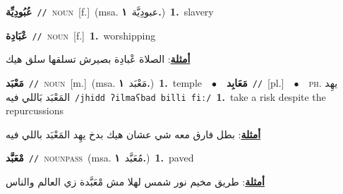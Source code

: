 \documentclass[10pt,a4paper,twoside]{article} %
\begin{document}
\begin{multicols}{2}
{{\setlength\topsep{0pt}\textbf{\foreignlanguage{arabic}{عُبُودِيِّة}}\ {\color{gray}\texttt{//}\color{black}}\ \textsc{noun}\ [f.]\ \color{gray}(msa. \foreignlanguage{arabic}{عبودِيَّة}~\foreignlanguage{arabic}{\textbf{١.}})\color{black}\ \textbf{1.}~slavery\ 

{\setlength\topsep{0pt}\textbf{\foreignlanguage{arabic}{عْبَادِة}}\ {\color{gray}\texttt{//}\color{black}}\ \textsc{noun}\ [f.]\ \textbf{1.}~worshipping\  \begin{flushright}\color{gray}\foreignlanguage{arabic}{\textbf{\underline{\foreignlanguage{arabic}{أمثلة}}}: الصلاة عْبادِة بصيرش تسلقها سلق هيك}\end{flushright}\color{black}} \vspace{2mm}

{\setlength\topsep{0pt}\textbf{\foreignlanguage{arabic}{مَعْبَد}}\ {\color{gray}\texttt{//}\color{black}}\ \textsc{noun}\ [m.]\ \color{gray}(msa. \foreignlanguage{arabic}{مَعْبَد}~\foreignlanguage{arabic}{\textbf{١.}})\color{black}\ \textbf{1.}~temple\ \ $\bullet$\ \ \setlength\topsep{0pt}\textbf{\foreignlanguage{arabic}{مَعَابِد}}\ {\color{gray}\texttt{//}\color{black}}\ [pl.]\ \ $\bullet$\ \ \textsc{ph.} \color{gray} \foreignlanguage{arabic}{يهِد المَعْبَد بَاللي فيه}\color{black}\ {\color{gray}\texttt{/{\sffamily jhidd ʔilmaʕbad billi fiː}/}\color{black}}\ \textbf{1.}~take a risk despite the repurcussions\  \begin{flushright}\color{gray}\foreignlanguage{arabic}{\textbf{\underline{\foreignlanguage{arabic}{أمثلة}}}: بطل فارق معه شي عشان هيك بدخ يهِد المَعْبَد باللي فيه}\end{flushright}\color{black}} \vspace{2mm}

{\setlength\topsep{0pt}\textbf{\foreignlanguage{arabic}{مْعَبَّد}}\ {\color{gray}\texttt{//}\color{black}}\ \textsc{noun\textunderscore pass}\ \color{gray}(msa. \foreignlanguage{arabic}{مُعَبَّد}~\foreignlanguage{arabic}{\textbf{١.}})\color{black}\ \textbf{1.}~paved\  \begin{flushright}\color{gray}\foreignlanguage{arabic}{\textbf{\underline{\foreignlanguage{arabic}{أمثلة}}}: طريق مخيم نور شمس لهلا مش مْعَبَّدة زي العالم والناس}\end{flushright}\color{black}} \vspace{2mm}

}}
\end{multicols}
\end{document}
